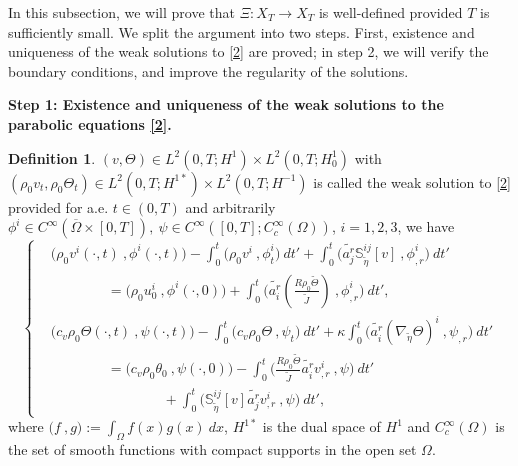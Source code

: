 \documentclass[12pt,a4paper]{amsart}
\numberwithin{equation}{section}
\theoremstyle{plain}
\theoremstyle{definition}
\newtheorem{Def}[Thm]{Definition}
\begin{document}
\vspace{0.3cm}
In this subsection, we will prove that $\Xi:X_T\rightarrow X_T$ is well-defined provided $T$ is sufficiently small. We split the argument into two steps. First, existence and uniqueness of the weak solutions to \eqref{2} are proved; in step 2, we will verify the boundary conditions, and improve the regularity of the solutions.

\textbf{Step 1: Existence and uniqueness of the weak solutions to the parabolic equations \eqref{2}.} 

\begin{Def}\label{def_weak}
	$(v,\Theta)\in L^2(0,T; H^1)\times L^2(0,T;H^1_0)$ with $(\rho_0v_t,\rho_0\Theta_t)\in L^2(0,T; H^{1*})\times L^2(0,T;H^{-1})$ is called the weak solution to \eqref{2} provided 
	for a.e. $t\in (0,T)$ and arbitrarily $\phi^i\in C^{\infty}(\overline{\Omega}\times[0,T]),~\psi\in C^{\infty}([0,T];C^{\infty}_c(\Omega))$,  $i=1,2,3$, we have
\begin{equation}
\label{weak}
\left\{\begin{aligned}
&\Big(\rho_0v^i (\cdot, t)~, \phi^i(\cdot,t) \Big)
   -\int_{0}^{t}\Big(\rho_0v^i~, \phi^i_t \Big) \ dt'
   +\int_{0}^{t}\Big(\widetilde{a^r_j}  \mathbb{S}^{ij}_{\widetilde{\eta}}[v]~, \phi^i_{,r}\Big)\ dt'\\
 &\qquad\qquad  =\Big(\rho_0u^i_0~, \phi^i(\cdot,0) \Big)
   +\int_{0}^{t} \Big(\widetilde{a^r_i}(\frac{R\rho_0 \widetilde{\Theta}}{\widetilde{J}})~, \phi^i_{,r}\Big)\ dt',\\
&\Big(c_v \rho_0\Theta(\cdot,t)~,\psi(\cdot,t)\Big)
   -\int_{0}^{t} \Big(c_v \rho_0\Theta~,\psi_t\Big) \ dt'
   +\kappa \int_{0}^{t} \Big(\widetilde{a^r_i}(\nabla_{\widetilde{\eta}}\Theta)^i~, \psi_{,r}\Big)\ dt'\\ 
&\qquad\qquad =\Big(c_v \rho_0\theta_0~,\psi(\cdot,0)\Big)
    -\int_{0}^{t}\Big(\frac{R\rho_0\widetilde{\Theta}}{\widetilde{J}}\widetilde{a^r_i}v^i_{,r}~,\psi\Big)\ dt' \\
 &\qquad\qquad\qquad\qquad +\int_{0}^{t}\Big(\mathbb{S}^{ij}_{\widetilde{\eta}}[v]\widetilde{a^r_j}v^i_{,r}~, \psi\Big)\ dt',
\end{aligned}
\right.
\end{equation}
where $\Big(f~,g\Big):=\int_{\Omega} f(x)g(x)\ dx$, $H^{1*}$ is the dual space of $H^1$ and $C^{\infty}_c(\Omega)$ is the set of smooth functions with compact supports in the open set $\Omega$.
\end{Def}
\end{document}
